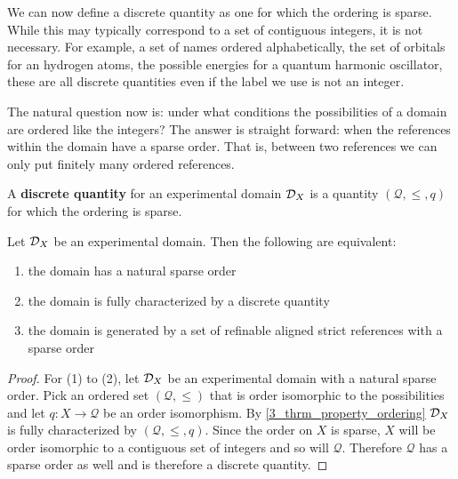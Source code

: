 \documentclass[11pt,letterpaper,fleqn]{memoir} %
\begin{document}
We can now define a discrete quantity as one for which the ordering is sparse. While this may typically correspond to a set of contiguous integers, it is not necessary. For example, a set of names ordered alphabetically, the set of orbitals for an hydrogen atoms, the possible energies for a quantum harmonic oscillator, these are all discrete quantities even if the label we use is not an integer.

The natural question now is: under what conditions the possibilities of a domain are ordered like the integers? The answer is straight forward: when the references within the domain have a sparse order. That is, between two references we can only put finitely many ordered references.

\begin{mathSection}
\begin{defn}
	A \textbf{discrete quantity} for an experimental domain $\mathcal{D}_X$ is a quantity $(\mathcal{Q}, \leq, q)$ for which the ordering is sparse.
\end{defn}

\begin{thrm}
	Let $\mathcal{D}_X$ be an experimental domain. Then the following are equivalent:
	\begin{enumerate}
		\item the domain has a natural sparse order
		\item the domain is fully characterized by a discrete quantity
		\item the domain is generated by a set of refinable aligned strict references with a sparse order
	\end{enumerate}
\end{thrm}
\begin{proof}
	For (1) to (2), let $\mathcal{D}_X$ be an experimental domain with a natural sparse order. Pick an ordered set $(\mathcal{Q}, \leq)$ that is order isomorphic to the possibilities and let $q: X \to \mathcal{Q}$ be an order isomorphism. By \ref{3_thrm_property_ordering} $\mathcal{D}_X$ is fully characterized by $(\mathcal{Q}, \leq, q)$. Since the order on $X$ is sparse, $X$ will be order isomorphic to a contiguous set of integers and so will $\mathcal{Q}$. Therefore $\mathcal{Q}$ has a sparse order as well and is therefore a discrete quantity.
	

\end{proof}
\end{mathSection}
\end{document}
